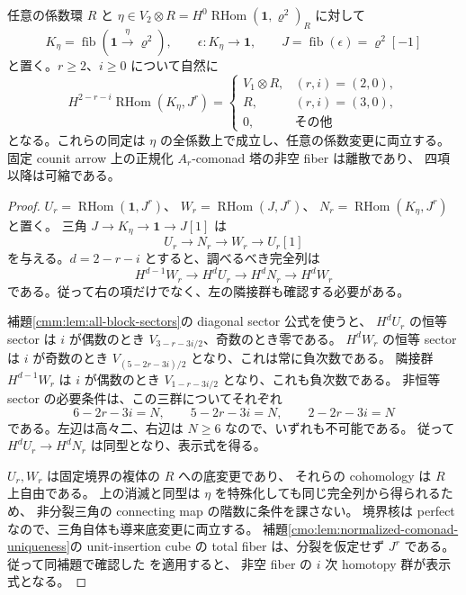 \begin{lemma}[全二次類上で一定な正規化比較群]
\label{lcc:lem:nonsplit-arity}
任意の係数環 $R$ と
$\eta\in V_2\otimes R=H^0\operatorname{RHom}(\mathbf1,\varrho^2)_R$ に対して
\[
 K_\eta=\operatorname{fib}(\mathbf1\xrightarrow{\eta}\varrho^2),
 \qquad \epsilon:K_\eta\longrightarrow\mathbf1,
 \qquad J=\operatorname{fib}(\epsilon)=\varrho^2[-1]
\]
と置く。$r\ge2$、$i\ge0$ について自然に
\begin{equation}\label{lcc:eq:nonsplit-arity}
 H^{2-r-i}\operatorname{RHom}(K_\eta,J^r)=
 \begin{cases}
  V_1\otimes R,&(r,i)=(2,0),\\
  R,&(r,i)=(3,0),\\
  0,&\text{その他}
 \end{cases}
\end{equation}
となる。これらの同定は $\eta$ の全係数上で成立し、任意の係数変更に両立する。
固定 counit arrow 上の正規化 $A_r$-comonad 塔の非空 fiber は離散であり、
四項以降は可縮である。
\end{lemma}

\begin{proof}
$U_r=\operatorname{RHom}(\mathbf1,J^r)$、
$W_r=\operatorname{RHom}(J,J^r)$、
$N_r=\operatorname{RHom}(K_\eta,J^r)$ と置く。
三角 $J\to K_\eta\to\mathbf1\to J[1]$ は
\[
 U_r\longrightarrow N_r\longrightarrow W_r\longrightarrow U_r[1]
\]
を与える。$d=2-r-i$ とすると、調べるべき完全列は
\[
 H^{d-1}W_r\longrightarrow H^dU_r\longrightarrow H^dN_r
       \longrightarrow H^dW_r
\]
である。従って右の項だけでなく、左の隣接群も確認する必要がある。

補題\ref{cmm:lem:all-block-sectors}の diagonal sector 公式を使うと、
$H^dU_r$ の恒等 sector は $i$ が偶数のとき
$V_{3-r-3i/2}$、奇数のとき零である。
$H^dW_r$ の恒等 sector は $i$ が奇数のとき
$V_{(5-2r-3i)/2}$ となり、これは常に負次数である。
隣接群 $H^{d-1}W_r$ は $i$ が偶数のとき
$V_{1-r-3i/2}$ となり、これも負次数である。
非恒等 sector の必要条件は、この三群についてそれぞれ
\[
 6-2r-3i=N,\qquad 5-2r-3i=N,\qquad 2-2r-3i=N
\]
である。左辺は高々二、右辺は $N\ge6$ なので、いずれも不可能である。
従って $H^dU_r\to H^dN_r$ は同型となり、表示式を得る。

$U_r,W_r$ は固定境界の複体の $R$ への底変更であり、
それらの cohomology は $R$ 上自由である。
上の消滅と同型は $\eta$ を特殊化しても同じ完全列から得られるため、
非分裂三角の connecting map の階数に条件を課さない。
境界核は perfect なので、三角自体も導来底変更に両立する。
補題\ref{cmo:lem:normalized-comonad-uniqueness}の unit-insertion cube の
total fiber は、分裂を仮定せず $J^r$ である。
従って同補題で確認した
\cite[Theorem~3.3, Lemma~3.11]{CMOWillumsgaardAssociativity}を適用すると、
非空 fiber の $i$ 次 homotopy 群が表示式となる。
\end{proof}


